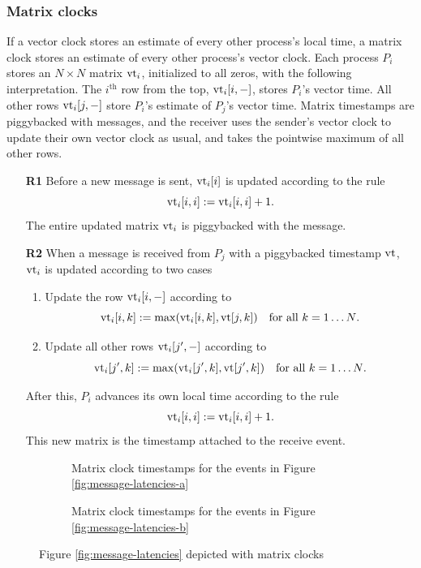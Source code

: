 \documentclass[]             %
{NASA}                       %
\theoremstyle{definition}
\begin{document}

\subsubsection{Matrix clocks}
\label{sssec:matrix-clocks}
If a vector clock stores an estimate of every other process's local
time, a matrix clock stores an estimate of every other process's
vector clock. Each process $P_i$ stores an $N\times{}N$ matrix
$\textrm{vt}_i$, initialized to all zeros, with the following
interpretation. The $i^{\textrm{th}}$ row from the top, $\textrm{vt}_i[i, -]$,
stores $P_i$'s vector time. All other rows $\textrm{vt}_i[j,-]$ store $P_i$'s
estimate of $P_j$'s vector time. Matrix timestamps are piggybacked
with messages, and the receiver uses the sender's vector clock to
update their own vector clock as usual, and takes the pointwise
maximum of all other rows.

\begin{enumerate}
\item[\textbf{R1}] Before a new message is sent, $\textrm{vt}_i[i]$ is updated according to the rule
  \[\textrm{vt}_i[i,i] := \textrm{vt}_i[i,i] + 1.\]
  The entire updated matrix $\textrm{vt}_i$ is piggybacked with the message.
\item[\textbf{R2}] When a message is received from $P_j$ with a piggybacked timestamp $\textrm{vt}$,
  $\textrm{vt}_i$ is updated according to two cases
  \begin{enumerate}
  \item Update the row $\textrm{vt}_i[i, -]$ according to
    \[\textrm{vt}_i[i, k] := \max(\textrm{vt}_i[i,k], \textrm{vt}[j, k]) \quad \textrm{for all $k = 1\ldots N$}.\]
  \item Update all other rows $\textrm{vt}_i[j', -]$ according to
    \[\textrm{vt}_i[j', k] := \max(\textrm{vt}_i[j',k], \textrm{vt}[j', k]) \quad \textrm{for all $k = 1\ldots N$}.\]
  \end{enumerate}
  After this, $P_i$ advances its own local time according to the rule
  \[ \textrm{vt}_i[i,i] := \textrm{vt}_i[i,i] + 1.\]
  This new matrix is the timestamp attached to the receive event.
\end{enumerate}

\begin{figure}[p]
  \begingroup
  \setlength\belowcaptionskip{4ex}
  \begin{subfigure}{1\textwidth}
    \caption{Matrix clock timestamps for the events in Figure \ref{fig:message-latencies-a}}
    \label{fig:message-latencies-matrix-a}
  \end{subfigure}
  \begin{subfigure}{1\textwidth}
    \caption{Matrix clock timestamps for the events in Figure \ref{fig:message-latencies-b}}
    \label{fig:message-latencies-matrix-b}
  \end{subfigure}
  \caption{Figure \ref{fig:message-latencies} depicted with matrix clocks}
  \label{fig:message-latencies-matrix}
  \endgroup
\end{figure}
\end{document}
